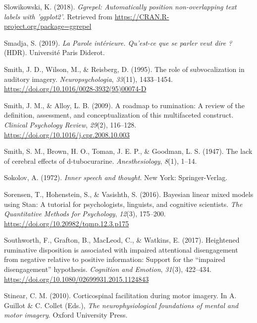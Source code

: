 \documentclass[a4paper,12pt,twoside,openright,oldfontcommands,final]{memoir}
\begin{document}
\leavevmode\hypertarget{ref-R-ggrepel}{}%
Slowikowski, K. (2018). \emph{Ggrepel: Automatically position non-overlapping text labels with 'ggplot2'}. Retrieved from \url{https://CRAN.R-project.org/package=ggrepel}

\leavevmode\hypertarget{ref-smadja_parole_2019}{}%
Smadja, S. (2019). \emph{La Parole intérieure. Qu'est-ce que se parler veut dire ?} (HDR). Université Paris Diderot.

\leavevmode\hypertarget{ref-smith_role_1995}{}%
Smith, J. D., Wilson, M., \& Reisberg, D. (1995). The role of subvocalization in auditory imagery. \emph{Neuropsychologia}, \emph{33}(11), 1433--1454. \url{https://doi.org/10.1016/0028-3932(95)00074-D}

\leavevmode\hypertarget{ref-Smith2009}{}%
Smith, J. M., \& Alloy, L. B. (2009). A roadmap to rumination: A review of the definition, assessment, and conceptualization of this multifaceted construct. \emph{Clinical Psychology Review}, \emph{29}(2), 116--128. \url{https://doi.org/10.1016/j.cpr.2008.10.003}

\leavevmode\hypertarget{ref-smith_lack_1947}{}%
Smith, S. M., Brown, H. O., Toman, J. E. P., \& Goodman, L. S. (1947). The lack of cerebral effects of d-tubocurarine. \emph{Anesthesiology}, \emph{8}(1), 1--14.

\leavevmode\hypertarget{ref-sokolov_inner_1972}{}%
Sokolov, A. (1972). \emph{Inner speech and thought}. New York: Springer-Verlag.

\leavevmode\hypertarget{ref-sorensen_bayesian_2016}{}%
Sorensen, T., Hohenstein, S., \& Vasishth, S. (2016). Bayesian linear mixed models using Stan: A tutorial for psychologists, linguists, and cognitive scientists. \emph{The Quantitative Methods for Psychology}, \emph{12}(3), 175--200. \url{https://doi.org/10.20982/tqmp.12.3.p175}

\leavevmode\hypertarget{ref-southworth_heightened_2017}{}%
Southworth, F., Grafton, B., MacLeod, C., \& Watkins, E. (2017). Heightened ruminative disposition is associated with impaired attentional disengagement from negative relative to positive information: Support for the ``impaired disengagement'' hypothesis. \emph{Cognition and Emotion}, \emph{31}(3), 422--434. \url{https://doi.org/10.1080/02699931.2015.1124843}

\leavevmode\hypertarget{ref-stinear_corticospinal_2010}{}%
Stinear, C. M. (2010). Corticospinal facilitation during motor imagery. In A. Guillot \& C. Collet (Eds.), \emph{The neurophysiological foundations of mental and motor imagery}. Oxford University Press.
\end{document}
